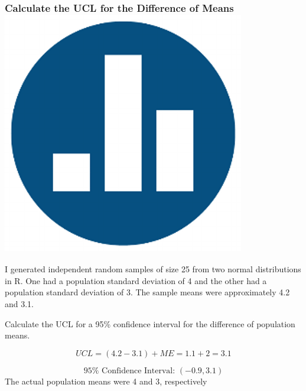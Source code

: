 \documentclass[handout]{beamer}
\begin{document}
\begin{frame}
\frametitle{Calculate the UCL for the Difference of Means \hfill \includegraphics[scale = 0.05]{./images/clicker}}
I generated independent random samples of size 25 from two normal distributions in R. One had a population standard deviation of 4 and the other had a population standard deviation of 3. The sample means were approximately 4.2 and 3.1.

\vspace{1em}
\alert{Calculate the UCL for a 95\% confidence interval for the difference of population means.}\pause

$$UCL = (4.2 - 3.1) + ME =1.1 + 2 = 3.1$$

\pause

\alert{$$\boxed{95\% \mbox{ Confidence Interval: } (-0.9, 3.1)}$$} \pause
The actual population means were 4 and 3, respectively
\end{frame}
\end{document}

